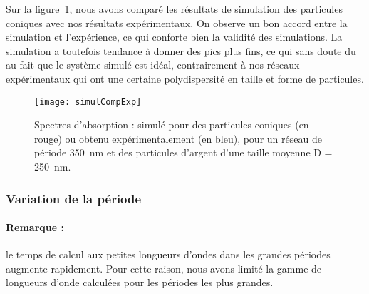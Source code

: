 Sur la figure~\ref{simulCompForme}, nous avons comparé les résultats de simulation des particules coniques avec nos résultats expérimentaux. On observe un bon accord entre la simulation et l’expérience, ce qui conforte bien la validité des simulations. La simulation a toutefois tendance à donner des pics plus fins, ce qui sans doute du au fait que le système simulé est idéal, contrairement à nos réseaux expérimentaux qui ont une certaine polydispersité en taille et forme de particules.\par 
\begin{figure}[!htb]
\centering
\texttt{[image: simulCompExp]}
\caption{Spectres d’absorption : simulé pour des particules coniques (en rouge) ou obtenu expérimentalement (en bleu), pour un réseau de période 350~nm et des particules d'argent d’une taille moyenne D = 250~nm.}
\label{simulCompForme}
\end{figure}
	\subsubsection{Variation de la période}
\paragraph*{Remarque :} le temps de calcul aux petites longueurs d’ondes dans les grandes périodes augmente rapidement. Pour cette raison, nous avons limité la gamme de longueurs d’onde calculées pour les périodes les plus grandes.\par 

